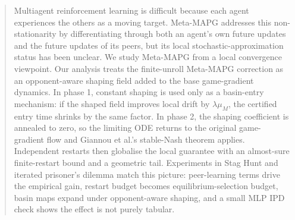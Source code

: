 \documentclass{article}
\theoremstyle{plain}
\theoremstyle{definition}
\theoremstyle{remark}
\begin{document}

\printAffiliationsAndNotice{}

\begin{abstract}
Multiagent reinforcement learning is difficult because each agent experiences the others as a moving target. Meta-MAPG addresses this non-stationarity by differentiating through both an agent's own future updates and the future updates of its peers, but its local stochastic-approximation status has been unclear. We study Meta-MAPG from a local convergence viewpoint. Our analysis treats the finite-unroll Meta-MAPG correction as an opponent-aware shaping field added to the base game-gradient dynamics. In phase 1, constant shaping is used only as a basin-entry mechanism: if the shaped field improves local drift by $\lambda\mu_M$, the certified entry time shrinks by the same factor. In phase 2, the shaping coefficient is annealed to zero, so the limiting ODE returns to the original game-gradient flow and Giannou et al.'s stable-Nash theorem applies. Independent restarts then globalise the local guarantee with an almost-sure finite-restart bound and a geometric tail. Experiments in Stag Hunt and iterated prisoner's dilemma match this picture: peer-learning terms drive the empirical gain, restart budget becomes equilibrium-selection budget, basin maps expand under opponent-aware shaping, and a small MLP IPD check shows the effect is not purely tabular.
\end{abstract}
\end{document}
